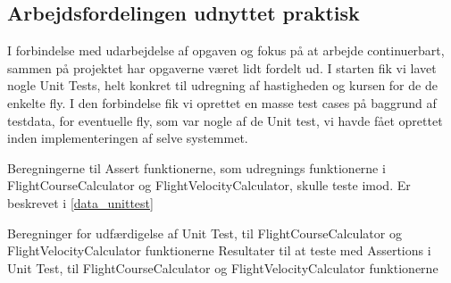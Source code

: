 \subsection{Arbejdsfordelingen udnyttet praktisk}

I forbindelse med udarbejdelse af opgaven og fokus på at arbejde continuerbart, sammen på projektet
har opgaverne været lidt fordelt ud. I starten fik vi lavet nogle Unit Tests, 
helt konkret til udregning af hastigheden og kursen for de de enkelte fly.
I den forbindelse fik vi oprettet en masse test cases på baggrund af testdata, for eventuelle fly, 
som var nogle af de Unit test, vi havde fået oprettet inden implementeringen af selve systemmet.

Beregningerne til Assert funktionerne, som udregnings funktionerne i FlightCourseCalculator og FlightVelocityCalculator, skulle teste imod. Er beskrevet i \ref{data_unittest}

 {Beregninger for udfærdigelse af Unit Test, til FlightCourseCalculator og FlightVelocityCalculator funktionerne}
 {Resultater til at teste med Assertions i Unit Test, til FlightCourseCalculator og FlightVelocityCalculator funktionerne}